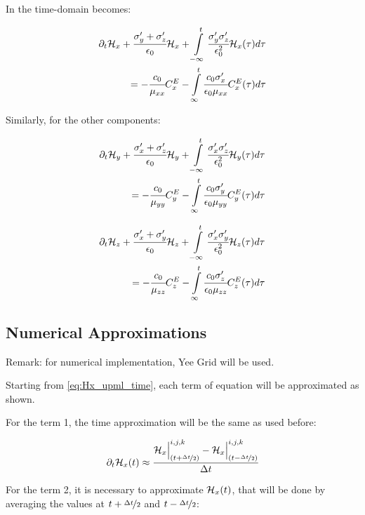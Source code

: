 In the time-domain becomes:

\begin{eqnarray}
    \partial_t\mathcal{H}_x + \cfrac{\sigma_y^{\prime} + \sigma_z^{\prime}}{\epsilon_0}\mathcal{H}_x + \int\limits_{-\infty}^t\cfrac{\sigma_y^{\prime}\sigma_z^{\prime}}{\epsilon_0^2}\mathcal{H}_x(\tau)d\tau \nonumber \\
    = -\cfrac{c_0}{\mu_{xx}}C_x^E - \int\limits_{\infty}^t\cfrac{c_0\sigma_x^{\prime}}{\epsilon_0\mu_{xx}}C_x^E(\tau)d\tau
    \label{eq:Hx_upml_time}
\end{eqnarray}

Similarly, for the other components:

\begin{eqnarray}
    \partial_t\mathcal{H}_y + \cfrac{\sigma_x^{\prime} + \sigma_z^{\prime}}{\epsilon_0}\mathcal{H}_y + \int\limits_{-\infty}^t\cfrac{\sigma_x^{\prime}\sigma_z^{\prime}}{\epsilon_0^2}\mathcal{H}_y(\tau)d\tau \nonumber \\
    = -\cfrac{c_0}{\mu_{yy}}C_y^E - \int\limits_{\infty}^t\cfrac{c_0\sigma_y^{\prime}}{\epsilon_0\mu_{yy}}C_y^E(\tau)d\tau
    \label{eq:Hy_upml_time}
\end{eqnarray}

\begin{eqnarray}
    \partial_t\mathcal{H}_z + \cfrac{\sigma_x^{\prime} + \sigma_y^{\prime}}{\epsilon_0}\mathcal{H}_z + \int\limits_{-\infty}^t\cfrac{\sigma_x^{\prime}\sigma_y^{\prime}}{\epsilon_0^2}\mathcal{H}_z(\tau)d\tau \nonumber \\
    = -\cfrac{c_0}{\mu_{zz}}C_z^E - \int\limits_{\infty}^t\cfrac{c_0\sigma_z^{\prime}}{\epsilon_0\mu_{zz}}C_z^E(\tau)d\tau
    \label{eq:Hz_upml_time}
\end{eqnarray}

\subsection{Numerical Approximations}

Remark: for numerical implementation, Yee Grid will be used.

Starting from \eqref{eq:Hx_upml_time}, each term of equation will be approximated as shown.

For the term 1, the time approximation will be the same as used before:

\begin{eqnarray}
    \partial_t\mathcal{H}_x(t) \approx \cfrac{\mathcal{H}_x\Big|_{(t+\nicefrac{\Delta t}{2})}^{i,j,k}-\mathcal{H}_x\Big|^{i,j,k}_{(t-\nicefrac{\Delta t}{2})}}{\Delta t}
\end{eqnarray}

For the term 2, it is necessary to approximate $\mathcal{H}_x(t)$, that will be done by averaging the values at $t + \nicefrac{\Delta t}{2}$ and $t - \nicefrac{\Delta t}{2}$:

